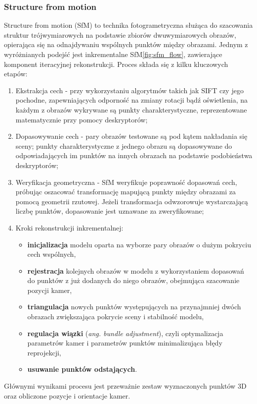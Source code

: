 \subsubsection{Structure from motion}
Structure from motion (SfM)\cite{Schonberger_2016_CVPR} to technika fotogrametryczna służąca do szacowania struktur trójwymiarowych na podstawie zbiorów dwuwymiarowych obrazów, opierająca się na odnajdywaniu wspólnych punktów między obrazami. Jednym z wyróżnianych podejść jest inkrementalne SfM\ref{fig:sfm_flow}, zawierające komponent iteracyjnej rekonstrukcji. Proces składa się z kilku kluczowych etapów:
\begin{enumerate}
  \item Ekstrakcja cech - przy wykorzystaniu algorytmów takich jak SIFT czy jego pochodne, zapewniających odporność na zmiany rotacji bądź oświetlenia, na każdym z obrazów wykrywane są punkty charakterystyczne, reprezentowane matematycznie przy pomocy deskryptorów;
  \item Dopasowywanie cech - pary obrazów testowane są pod kątem nakładania się sceny; punkty charakterystyczne z jednego obrazu są dopasowywane do odpowiadających im punktów na innych obrazach na podstawie podobieństwa deskryptorów;
  \item Weryfikacja geometryczna - SfM weryfikuje poprawność dopasowań cech, próbując oszacować transformację mapującą punkty między obrazami za pomocą geometrii rzutowej. Jeżeli transformacja odwzorowuje wystarczającą liczbę punktów, dopasowanie jest uznawane za zweryfikowane;
  \item Kroki rekonstrukcji inkrementalnej:
    \begin{itemize}
      \item \textbf{inicjalizacja} modelu oparta na wyborze pary obrazów o dużym pokryciu cech wspólnych,
      \item \textbf{rejestracja} kolejnych obrazów w modelu z wykorzystaniem dopasowań do punktów z już dodanych do niego obrazów, obejmująca szacowanie pozycji kamer,
      \item \textbf{triangulacja} nowych punktów występujących na przynajmniej dwóch obrazach zwiększająca pokrycie sceny i stabilność modelu,
      \item \textbf{regulacja wiązki} (\textit{ang. bundle adjustment}), czyli optymalizacja parametrów kamer i parametrów punktów minimalizująca błędy reprojekcji,
      \item \textbf{usuwanie punktów odstających}.
    \end{itemize}
\end{enumerate}
Głównymi wynikami procesu jest przeważnie zestaw wyznaczonych punktów 3D oraz obliczone pozycje i orientacje kamer.

